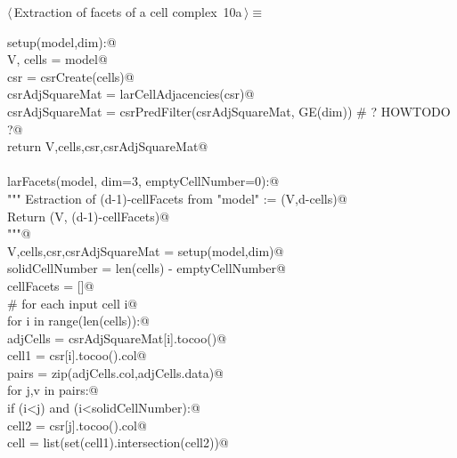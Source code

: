 \documentclass[11pt,oneside]{article}	%
\begin{document}
\begin{flushleft} \small \label{scrap18}
\protect{}$\langle\,$Extraction of facets of a cell complex\nobreak\ {\footnotesize 10a}$\,\rangle\equiv$
\vspace{-1ex}
\begin{list}{}{} \item
\mbox{}\verb@def setup(model,dim):@\\
\mbox{}\verb@    V, cells = model@\\
\mbox{}\verb@    csr = csrCreate(cells)@\\
\mbox{}\verb@    csrAdjSquareMat = larCellAdjacencies(csr)@\\
\mbox{}\verb@    csrAdjSquareMat = csrPredFilter(csrAdjSquareMat, GE(dim)) # ? HOWTODO ?@\\
\mbox{}\verb@    return V,cells,csr,csrAdjSquareMat@\\
\mbox{}\verb@@\\
\mbox{}\verb@def larFacets(model, dim=3, emptyCellNumber=0):@\\
\mbox{}\verb@    """ Estraction of (d-1)-cellFacets from "model" := (V,d-cells)@\\
\mbox{}\verb@        Return (V, (d-1)-cellFacets)@\\
\mbox{}\verb@      """@\\
\mbox{}\verb@    V,cells,csr,csrAdjSquareMat = setup(model,dim)@\\
\mbox{}\verb@    solidCellNumber = len(cells) - emptyCellNumber@\\
\mbox{}\verb@    cellFacets = []@\\
\mbox{}\verb@    # for each input cell i@\\
\mbox{}\verb@    for i in range(len(cells)):@\\
\mbox{}\verb@        adjCells = csrAdjSquareMat[i].tocoo()@\\
\mbox{}\verb@        cell1 = csr[i].tocoo().col@\\
\mbox{}\verb@        pairs = zip(adjCells.col,adjCells.data)@\\
\mbox{}\verb@        for j,v in pairs:@\\
\mbox{}\verb@            if (i<j) and (i<solidCellNumber):@\\
\mbox{}\verb@                cell2 = csr[j].tocoo().col@\\
\mbox{}\verb@                cell = list(set(cell1).intersection(cell2))@\\

\end{list}
\end{flushleft}
\end{document}
